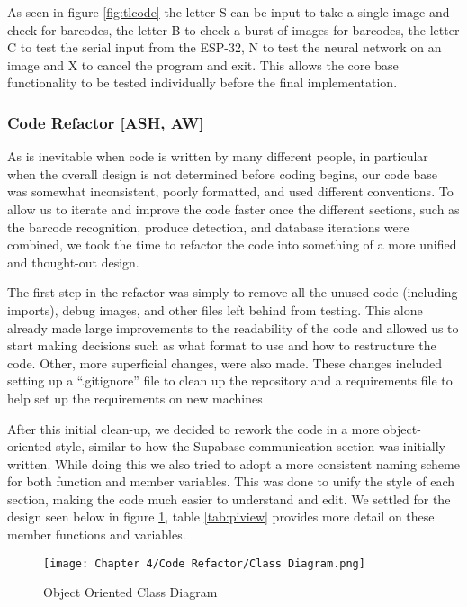 As seen in figure \ref{fig:tlcode} the letter S can be input to take a single image and check for barcodes, the letter B to check a burst of images for barcodes, the letter C to test the serial input from the ESP-32, N to test the neural network on an image and X to cancel the program and exit.
This allows the core base functionality to be tested individually before the final implementation.

\subsubsection {Code Refactor [ASH, AW]}

As is inevitable when code is written by many different people, in particular when the overall design is not determined before coding begins, our code base was somewhat inconsistent, poorly formatted, and used different conventions.
To allow us to iterate and improve the code faster once the different sections, such as the barcode recognition, produce detection, and database iterations were combined, we took the time to refactor the code into something of a more unified and thought-out design.

The first step in the refactor was simply to remove all the unused code (including imports), debug images, and other files left behind from testing.
This alone already made large improvements to the readability of the code and allowed us to start making decisions such as what format to use and how to restructure the code.
Other, more superficial changes,  were also made.
These changes included setting up a “.gitignore” file to clean up the repository and a requirements file to help set up the requirements on new machines

After this initial clean-up, we decided to rework the code in a more object-oriented style, similar to how the Supabase communication section was initially written.
While doing this we also tried to adopt a more consistent naming scheme for both function and member variables.
This was done to unify the style of each section, making the code much easier to understand and edit.
We settled for the design seen below in figure \ref{fig:oocd}, table \ref{tab:piview} provides more detail on these member functions and variables.

\begin{figure}[H]        
    \centering
    \texttt{[image: Chapter 4/Code Refactor/Class Diagram.png]}
    \caption{Object Oriented Class Diagram}
    \label{fig:oocd}
\end{figure} 

